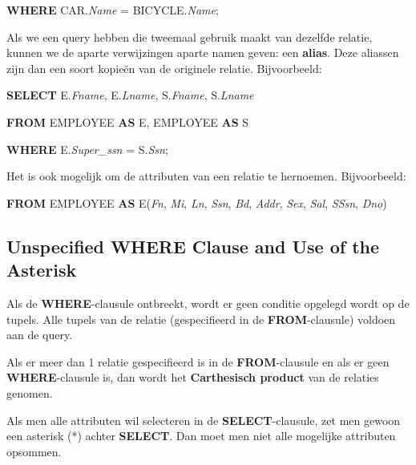 \vspace{1mm}\hspace{10mm}
\textbf{WHERE} CAR.\textit{Name} = BICYCLE.\textit{Name};
\vspace{3mm}

\noindent Als we een query hebben die tweemaal gebruik maakt van dezelfde relatie, kunnen we de aparte verwijzingen aparte namen geven: een \textbf{alias}. Deze aliassen zijn dan een soort kopie\"en van de originele relatie. Bijvoorbeeld:

\vspace{1mm}\hspace{10mm}
\textbf{SELECT} E.\textit{Fname}, E.\textit{Lname}, S.\textit{Fname}, S.\textit{Lname}

\hspace{10mm}
\textbf{FROM} EMPLOYEE \textbf{AS} E, EMPLOYEE \textbf{AS} S

\hspace{10mm}
\textbf{WHERE} E.\textit{Super\_ssn} = S.\textit{Ssn};
\vspace{3mm}

\noindent Het is ook mogelijk om de attributen van een relatie te hernoemen. Bijvoorbeeld:

\vspace{1mm}\hspace{10mm}
\textbf{FROM} EMPLOYEE \textbf{AS} E(\textit{Fn}, \textit{Mi}, \textit{Ln}, \textit{Ssn}, \textit{Bd}, \textit{Addr}, \textit{Sex}, \textit{Sal}, \textit{SSsn}, \textit{Dno})


\subsection{Unspecified WHERE Clause and Use of the Asterisk}
Als de \textbf{WHERE}-clausule ontbreekt, wordt er geen conditie opgelegd wordt op de tupels. Alle tupels van de relatie (gespecifieerd in de \textbf{FROM}-clausule) voldoen aan de query.

Als er meer dan 1 relatie gespecifieerd is in de \textbf{FROM}-clausule en als er geen \textbf{WHERE}-clausule is, dan wordt het \textbf{Carthesisch product} van de relaties genomen.

Als men alle attributen wil selecteren in de \textbf{SELECT}-clausule, zet men gewoon een asterisk (*) achter \textbf{SELECT}.  Dan moet men niet alle mogelijke attributen opsommen.



